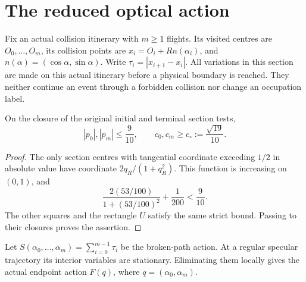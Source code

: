 \section{The reduced optical action}
\label{sec:v109-action}
Fix an actual collision itinerary with $m\geq1$ flights. Its visited
centres are $O_0,\ldots,O_m$, its collision points are
$x_i=O_i+R n(\alpha_i)$, and $n(\alpha)=(\cos\alpha,\sin\alpha)$.
Write $\tau_i=|x_{i+1}-x_i|$. All variations in this section are made
on this actual itinerary before a physical boundary is reached.
They neither continue an event through a forbidden collision nor
change an occupation label.

\begin{lemma}
\label{lem:v109-section}
On the closure of the original initial and terminal section tests,
\begin{equation}\label{eq:v109-endpoint-cap}
 |p_0|,|p_m|\leq\frac9{10},\qquad
 c_0,c_m\geq c_\circ:=\frac{\sqrt{19}}{10}.
\end{equation}
\end{lemma}
\begin{proof}
The only section centres with tangential coordinate exceeding $1/2$
in absolute value have coordinate $2q_R/(1+q_R^2)$.
This function is increasing on $(0,1)$, and
\[
 \frac{2(53/100)}{1+(53/100)^2}+\frac1{200}<\frac9{10}.
\]
The other squares and the rectangle $U$ satisfy the same strict
bound. Passing to their closures proves the assertion.
\end{proof}

Let $S(\alpha_0,\ldots,\alpha_m)=\sum_{i=0}^{m-1}\tau_i$ be the
broken-path action. At a regular specular trajectory its interior
variables are stationary. Eliminating them locally gives the actual
endpoint action $F(q)$, where $q=(\alpha_0,\alpha_m)$.

